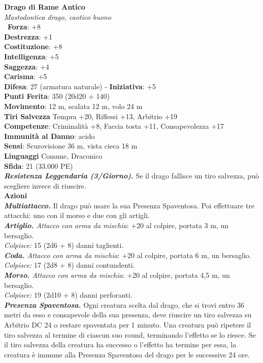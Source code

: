 \begin{multicols}{2}
\medskip\textbf{Drago di Rame Antico}\\
\emph{Mastodontica drago, caotico buono}\\\
\textbf{Forza}: +8\\
\textbf{Destrezza}: +1\\
\textbf{Costituzione}: +8\\
\textbf{Intelligenza}: +5\\
\textbf{Saggezza}: +4\\
\textbf{Carisma}: +5\\
\textbf{Difesa}: 27 (armatura naturale) - \textbf{Iniziativa}: +5\\
\textbf{Punti Ferita}: 350 (20d20 + 140)\\
\textbf{Movimento}: 12 m, scalata 12 m, volo 24 m\\
\textbf{Tiri Salvezza} Tempra +20, Riflessi +13, Arbitrio +19\\
\textbf{Competenze}: Criminalità +8, Faccia tosta +11, Consapevolezza +17\\
\textbf{Immunità al Danno}: acido\\
\textbf{Sensi}: Scurovisione 36 m, vista cieca 18 m\\
\textbf{Linguaggi} Comune, Draconico\\
\textbf{Sfida}: 21 (33.000 PE)\smallskip\\
\emph{\textbf{Resistenza Leggendaria (3/Giorno).}} Se il drago fallisce un tiro salvezza, può scegliere invece di riuscire.\\
\smallskip\textbf{Azioni}\\
\emph{\textbf{Multiattacco.}} Il drago può usare la sua Presenza Spaventosa. Poi effettuare tre attacchi: uno con il morso e due con gli artigli.\\
\emph{\textbf{Artiglio.} Attacco con arma da mischia}: +20 al colpire, portata 3 m, un bersaglio.\\
\emph{Colpisce:} 15 (2d6 + 8) danni taglienti.\\
\emph{\textbf{Coda.} Attacco con arma da mischia}: +20 al colpire, portata 6 m, un bersaglio.\\
\emph{Colpisce:} 17 (2d8 + 8) danni contundenti.\\
\emph{\textbf{Morso.} Attacco con arma da mischia}: +20 al colpire, portata 4,5 m, un bersaglio.\\
\emph{Colpisce:} 19 (2d10 + 8) danni perforanti.\\
\emph{\textbf{Presenza Spaventosa.}} Ogni creatura scelta dal drago, che si trovi entro 36 metri da esso e consapevole della sua presenza, deve riuscire un tiro salvezza su Arbitrio DC  24 o restare spaventata per 1 minuto. Una creatura può ripetere il tiro salvezza al termine di ciascun suo round, terminando l'effetto se lo riesce. Se il tiro salvezza della creatura ha successo o l'effetto ha termine per essa, la creatura è immune alla Presenza Spaventosa del drago per le successive 24 ore.\\

\end{multicols}
